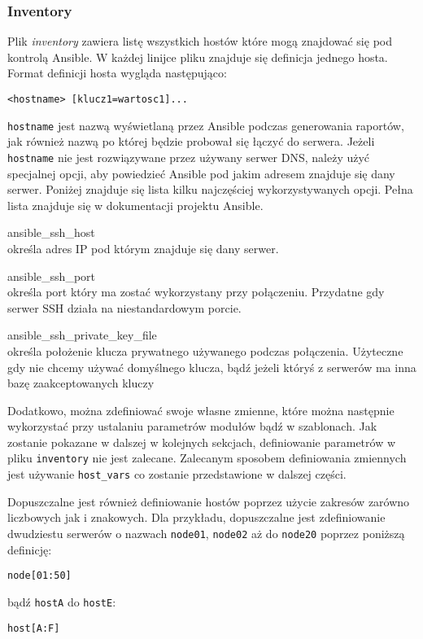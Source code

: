 \subsubsection{Inventory}
Plik \textit{inventory} zawiera listę wszystkich hostów które mogą znajdować się pod kontrolą Ansible.  
W każdej linijce pliku znajduje się definicja jednego hosta.
Format definicji hosta wygląda następująco:
\begin{lstlisting}
<hostname> [klucz1=wartosc1]...
\end{lstlisting}
\texttt{hostname} jest nazwą wyświetlaną przez Ansible podczas generowania raportów, jak również nazwą po której będzie probował się łączyć do serwera.
Jeżeli \texttt{hostname} nie jest rozwiązywane przez używany serwer DNS, należy użyć specjalnej opcji, aby powiedzieć Ansible pod jakim adresem znajduje się dany serwer.
Poniżej znajduje się lista kilku najczęściej wykorzystywanych opcji. Pełna lista znajduje się w dokumentacji projektu Ansible.
\begin{description}
\item{ansible\_ssh\_host}\\
	określa adres IP pod którym znajduje się dany serwer.	
\item{ansible\_ssh\_port}\\
	określa port który ma zostać wykorzystany przy połączeniu. Przydatne gdy serwer SSH działa na niestandardowym porcie.
\item{ansible\_ssh\_private\_key\_file}\\
	określa położenie klucza prywatnego używanego podczas połączenia. Użyteczne gdy nie chcemy używać domyślnego klucza, bądź jeżeli któryś z serwerów ma inna bazę zaakceptowanych kluczy
\end{description}
Dodatkowo, można zdefiniować swoje własne zmienne, które można następnie wykorzystać przy ustalaniu parametrów modułów bądź w szablonach.  
Jak zostanie pokazane w dalszej w kolejnych sekcjach, definiowanie parametrów w pliku \texttt{inventory} nie jest zalecane.
Zalecanym sposobem definiowania zmiennych jest używanie \texttt{host\_vars} co zostanie przedstawione w dalszej części.

Dopuszczalne jest również definiowanie hostów poprzez użycie zakresów zarówno liczbowych jak i znakowych.
Dla przykładu, dopuszczalne jest zdefiniowanie dwudziestu serwerów o nazwach \texttt{node01}, \texttt{node02} aż do \texttt{node20} poprzez poniższą definicję:
\begin{lstlisting}
node[01:50]
\end{lstlisting}
bądź \texttt{hostA} do \texttt{hostE}:
\begin{lstlisting}
host[A:F]
\end{lstlisting}

